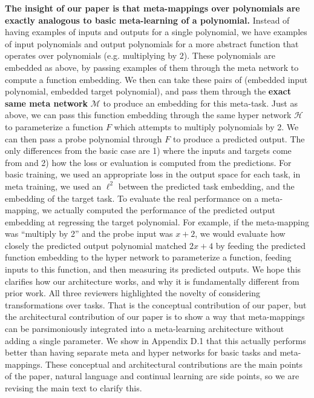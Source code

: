 \documentclass{article}
\begin{document}
\textbf{The insight of our paper is that meta-mappings over polynomials are exactly analogous to basic meta-learning of a polynomial.} Instead of having examples of inputs and outputs for a single polynomial, we have examples of input polynomials and output polynomials for a more abstract function that operates over polynomials (e.g. multiplying by 2). These polynomials are embedded as above, by passing examples of them through the meta network to compute a function embedding. We then can take these pairs of (embedded input polynomial, embedded target polynomial), and pass them through the \textbf{exact same meta network} $\mathcal{M}$ to produce an embedding for this meta-task. Just as above, we can pass this function embedding through the same hyper network $\mathcal{H}$ to parameterize a function $F$ which attempts to multiply polynomials by 2. We can then pass a probe polynomial through $F$ to produce a predicted output. The only differences from the basic case are 1) where the inputs and targets come from and 2) how the loss or evaluation is computed from the predictions. For basic training, we used an appropriate loss in the output space for each task, in meta training, we used an $\ell^2$ between the predicted task embedding, and the embedding of the target task. To evaluate the real performance on a meta-mapping, we actually computed the performance of the predicted output embedding at regressing the target polynomial. For example, if the meta-mapping was ``multiply by 2'' and the probe input was $x + 2$, we would evaluate how closely the predicted output polynomial matched $2x + 4$ by feeding the predicted function embedding to the hyper network to parameterize a function, feeding inputs to this function, and then measuring its predicted outputs. We hope this clarifies how our architecture works, and why it is fundamentally different from prior work. All three reviewers highlighted the novelty of considering transformations over tasks. That is the conceptual contribution of our paper, but the architectural contribution of our paper is to show a way that meta-mappings can be parsimoniously integrated into a meta-learning architecture without adding a single parameter. We show in Appendix D.1 that this actually performs better than having separate meta and hyper networks for basic tasks and meta-mappings. These conceptual and architectural contributions are the main points of the paper, natural language and continual learning are side points, so we are revising the main text to clarify this. \par 
{}
\end{document}
